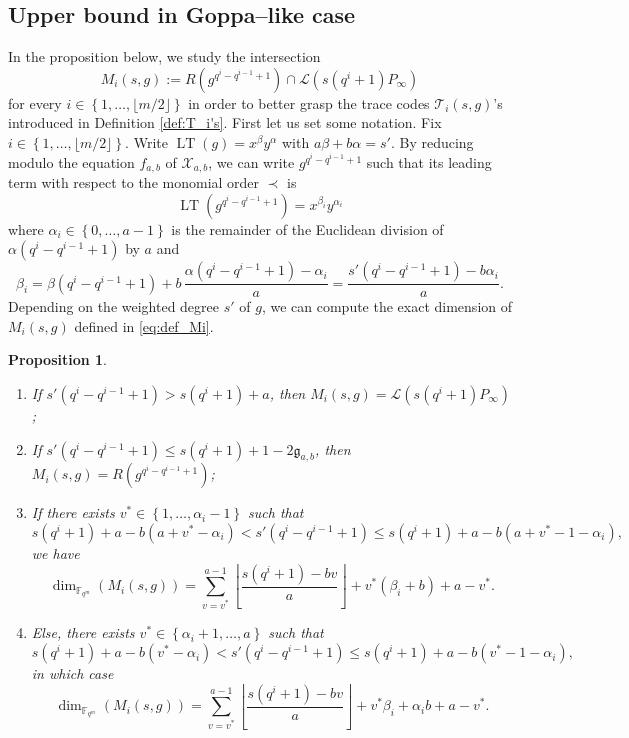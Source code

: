 \documentclass[a4paper]{article}
\newtheorem{proposition}[thm]{Proposition}
\theoremstyle{definition}
\theoremstyle{remark}
\newcommand{\calL}{\mathcal{L}}
\newcommand{\calT}{\mathcal{T}}
\newcommand{\calX}{\mathcal{X}}
\newcommand{\fqm}{\mathbb{F}_{q^m}}
\newcommand{\set}[1]{\left\{#1\right\}}
\newcommand{\LT}[1]{\operatorname{LT}\left(#1\right)}
\begin{document}
\subsection{Upper bound in Goppa--like case}
In the proposition below, we study the intersection 
\begin{equation}\label{eq:def_Mi}
M_i(s,g):=R\left(g^{q^{i}-q^{i-1}+1}\right) \cap \calL(s(q^i+1)P_\infty)
\end{equation}
for every $i \in \set{1,\dots,\lfloor m/2 \rfloor}$ in order to better grasp the trace codes $\calT_i(s,g)$'s introduced in Definition \ref{def:T_i's}.
First let us set some notation. Fix $i \in \set{1,\dots,\lfloor m/2 \rfloor}$. Write $\LT{g}=x^\beta y^\alpha$ with $a\beta + b\alpha=s'$. By reducing modulo the equation $f_{a,b}$ of $\calX_{a,b}$, we can write $g^{q^i-q^{i-1}+1}$ such that its leading term with respect to the monomial order $\prec$ is
\begin{equation}\label{eq:gi}
 \LT{g^{q^i-q^{i-1}+1}}=x^{\beta_i} y^{\alpha_i}
\end{equation}
 where $\alpha_i \in \set{0,\dots,a-1}$ is the remainder of the Euclidean division of $\alpha (q^i-q^{i-1}+1)$ by $a$ and 
 \begin{equation}\label{eq:value_beta_prime}
  \beta_i=\beta(q^i-q^{i-1}+1) + b \, \frac{\alpha(q^i-q^{i-1}+1)-\alpha_i}{a}= \frac{s'(q^i-q^{i-1}+1)-b\alpha_i}{a}.
 \end{equation}
%
Depending on the weighted degree $s'$ of $g$, we can compute the exact dimension of $M_i(s,g)$ defined in \eqref{eq:def_Mi}.
\begin{proposition} \label{prop:dim_M_i's}
    \begin{enumerate}
        \item If $s'(q^i-q^{i-1}+1) > s(q^i+1)+a$, then $M_i(s,g) = \calL(s(q^i+1)P_\infty)$ ;
        
        \item If $s'(q^i-q^{i-1}+1) \leq s(q^i+1)+1-2\mathfrak{g}_{a,b}$, then $M_i(s,g) = R(g^{q^{i}-q^{i-1}+1})$;
        
        \item If there exists $v^* \in \set{1,\dots,\alpha_i-1}$ such that
        $$ s(q^i+1)+a-b(a+v^*-\alpha_i) < s'(q^i-q^{i-1}+1) \leq  s(q^i+1)+a-b(a+v^*-1-\alpha_i),$$
        we have 
          $$\dim_{\fqm}(M_i(s,g)) = \sum\limits_{v=v^*}^{a-1} \left\lfloor \dfrac{s(q^i+1)-bv}{a} \right\rfloor + v^*(\beta_i+b) + a-v^*.$$
        
        \item Else, there exists $v^* \in \set{\alpha_i+1,\dots,a}$ such that
        $$ s(q^i+1)+a-b(v^*-\alpha_i) < s'(q^i-q^{i-1}+1) \leq  s(q^i+1)+a-b(v^*-1-\alpha_i),$$
        in which case 
        $$\dim_{\fqm}(M_i(s,g)) = \sum\limits_{v=v^*}^{a-1} \left\lfloor \dfrac{s(q^i+1)-bv}{a} \right\rfloor + v^*\beta_i + \alpha_ib +a-v^*.$$
    \end{enumerate}
\end{proposition}
\end{document}

